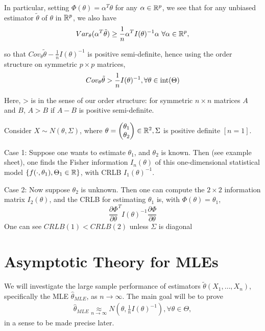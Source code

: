 \documentclass[a4paper]{article}
\begin{document}
In particular, setting $\Phi(\theta) = \alpha ^{T} \theta$ for any $\alpha \in  \mathbb{R}^{p}$, we see that for any unbiased estimator $\tilde{\theta}$ of $\theta$ in $\mathbb{R}^{p}$, we also have
\[
	Var_{\theta} (\alpha ^{T}\tilde{\theta}) \ge \frac{1}{n} \alpha ^{T}I(\theta)^{-1}\alpha \text{     } \forall \alpha \in \mathbb{R}^{p},
\] 

so that $Cov_{\theta} \tilde{\theta} - \frac{1}{n} I(\theta)^{-1}$ is positive semi-definite, hence using the order structure on symmetric $p\times p$ matrices,
\[
	Cov_{\theta} \tilde{\theta} > \frac{1}{n} I(\theta)^{-1}, \forall \theta \in\operatorname{int}(\Theta)
\] 

\begin{note}
	Here, > is in the sense of our order structure: for symmetric $n\times n$ matrices $A$ and $B$,  $A>B$ if $A-B$ is positive semi-definite.
\end{note}

\begin{eg}
	Consider $X \sim N(\theta, \Sigma)$, where $\theta = \begin{pmatrix} \theta_1 \\ \theta_2 \end{pmatrix} \in \mathbb{R}^{2}, \Sigma$ is positive definite $[n=1] $.

	Case 1: Suppose one wants to estimate $\theta_1$, and  $\theta_2$ is known. Then (see example sheet), one finds the Fisher information $I_{n}(\theta)$ of this one-dimensional statistical model $\{f(\cdot , \theta_1), \Theta_1 \in  \mathbb{R}\} $, with CRLB  $I_1(\theta)^{-1}$.

	Case 2: Now suppose $\theta_2$ is unknown. Then one can compute the $2\times 2$ information matrix $I_2(\theta)$, and the CRLB for estimating $\theta_1$ is, with $\Phi(\theta) = \theta_1$, 
	\[
		\frac{\partial\Phi}{\partial\theta}^{T} I(\theta)^{-1} \frac{\partial\Phi}{\partial\theta}
	\] 
	One can see $CRLB(1) < CRLB(2) $ unless  $\Sigma$ is diagonal
\end{eg}

\section{Asymptotic Theory for MLEs}

We will investigate the large sample performance of estimators $\tilde{\theta}(X_1, \ldots, X_n)$, specifically the MLE $\hat{\theta}_{MLE}$, as $n\to \infty$. The main goal will be to prove
\begin{align*}
	\hat{\theta}_{MLE} \underset{n\to\infty}{\approx} N\left(\theta, \frac{1}{n} I(\theta)^{-1}\right), \forall \theta \in  \Theta
,\end{align*} 
 in a sense to be made precise later.
\end{document}
